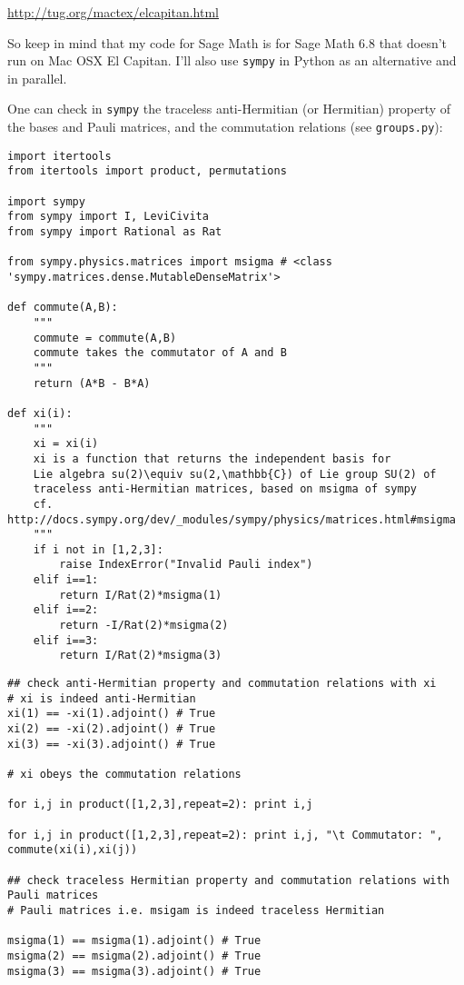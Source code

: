 \documentclass[10pt]{amsart}
\begin{document}
\begin{multicols*}{2}
\url{http://tug.org/mactex/elcapitan.html}

So keep in mind that my code for Sage Math is for Sage Math 6.8 that doesn't run on Mac OSX El Capitan.  I'll also use \verb|sympy| in Python as an alternative and in parallel.  

One can check in \verb|sympy| the traceless anti-Hermitian (or Hermitian) property of the bases and Pauli matrices, and the commutation relations (see \verb|groups.py|):

\begin{lstlisting}
import itertools
from itertools import product, permutations

import sympy
from sympy import I, LeviCivita
from sympy import Rational as Rat

from sympy.physics.matrices import msigma # <class 'sympy.matrices.dense.MutableDenseMatrix'>

def commute(A,B):
    """
    commute = commute(A,B)
    commute takes the commutator of A and B
    """
    return (A*B - B*A)

def xi(i):
    """
    xi = xi(i)
    xi is a function that returns the independent basis for 
    Lie algebra su(2)\equiv su(2,\mathbb{C}) of Lie group SU(2) of 
    traceless anti-Hermitian matrices, based on msigma of sympy
    cf. http://docs.sympy.org/dev/_modules/sympy/physics/matrices.html#msigma
    """
    if i not in [1,2,3]:
        raise IndexError("Invalid Pauli index")
    elif i==1:
        return I/Rat(2)*msigma(1)
    elif i==2:
        return -I/Rat(2)*msigma(2)
    elif i==3:
        return I/Rat(2)*msigma(3)

\end{lstlisting}

\begin{lstlisting}
## check anti-Hermitian property and commutation relations with xi 
# xi is indeed anti-Hermitian
xi(1) == -xi(1).adjoint() # True
xi(2) == -xi(2).adjoint() # True
xi(3) == -xi(3).adjoint() # True

# xi obeys the commutation relations

for i,j in product([1,2,3],repeat=2): print i,j

for i,j in product([1,2,3],repeat=2): print i,j, "\t Commutator: ", commute(xi(i),xi(j))

## check traceless Hermitian property and commutation relations with Pauli matrices
# Pauli matrices i.e. msigam is indeed traceless Hermitian

msigma(1) == msigma(1).adjoint() # True
msigma(2) == msigma(2).adjoint() # True
msigma(3) == msigma(3).adjoint() # True


\end{lstlisting}
\end{multicols*}
\end{document}
